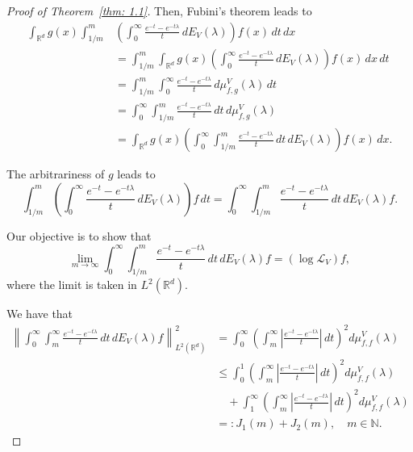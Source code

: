 \documentclass[10pt, a4paper, reqno]{amsart}
\theoremstyle{definition}
\theoremstyle{remark}
\numberwithin{equation}{section}
\begin{document}
\begin{proof}[Proof of Theorem~\ref{thm: 1.1}]
Then, Fubini's theorem leads to 
\begin{equation*}
    \begin{split}
        \int_{\mathbb{R}^d} g(x) \int_{1/m}^m & \left( \int_0^\infty \frac{e^{-t} - e^{-t\lambda}}{t} \, dE_V(\lambda)\right) f(x) \, dt \, dx \\
        & = \int_{1/m}^m \int_{\mathbb{R}^d} g(x) \left( \int_0^\infty \frac{e^{-t} - e^{-t\lambda}}{t} \, dE_V(\lambda)\right) f(x) \, dx \, dt \\
        & = \int_{1/m}^m \int_0^\infty \frac{e^{-t} - e^{-t\lambda}}{t} \, d\mu_{f,g}^V(\lambda) \, dt \\
        & = \int_0^\infty \int_{1/m}^m \frac{e^{-t} - e^{-t\lambda}}{t} \, dt \, d\mu_{f,g}^V(\lambda) \\
        & = \int_{\mathbb{R}^d} g(x) \left( \int_0^\infty \int_{1/m}^m \frac{e^{-t} - e^{-t\lambda}}{t} \, dt \, dE_V(\lambda) \right) f(x) \, dx.
    \end{split}
\end{equation*}

The arbitrariness of $g$ leads to 
\begin{equation*}
    \int_{1/m}^m \left( \int_0^\infty \frac{e^{-t} - e^{-t\lambda}}{t} \, dE_V(\lambda) \right) f \, dt = \int_0^\infty \int_{1/m}^m \frac{e^{-t} - e^{-t\lambda}}{t} \, dt \, dE_V(\lambda) f.
\end{equation*}

Our objective is to show that 
\begin{equation*}
    \lim_{m \rightarrow \infty} \int_0^\infty \int_{1/m}^m \frac{e^{-t} - e^{-t\lambda}}{t} \, dt \, dE_V(\lambda) f = (\log \mathcal{L}_V) f,
\end{equation*}
where the limit is taken in $L^2(\mathbb{R}^d)$.


We have that 
\begin{equation*}
    \begin{split}
        \left\| \int_0^\infty \int_m^\infty \frac{e^{-t} - e^{-t\lambda}}{t} \, dt \, dE_V(\lambda) f \right\|_{L^2(\mathbb{R}^d)}^2 
        & = \int_0^\infty \left( \int_m^\infty \left| \frac{e^{-t} - e^{-t\lambda}}{t} \right| \, dt \right)^2 d\mu_{f,f}^V(\lambda) \\
        & \leq \int_0^1 \left( \int_m^\infty \left| \frac{e^{-t} - e^{-t\lambda}}{t} \right| \, dt \right)^2 d\mu_{f,f}^V(\lambda) \\
        & \quad + \int_1^\infty \left( \int_m^\infty \left| \frac{e^{-t} - e^{-t\lambda}}{t} \right| \, dt \right)^2 d\mu_{f,f}^V(\lambda) \\
        & =: J_1(m) + J_2(m), \quad m \in \mathbb{N}.
    \end{split}
\end{equation*}


\end{proof}
\end{document}
